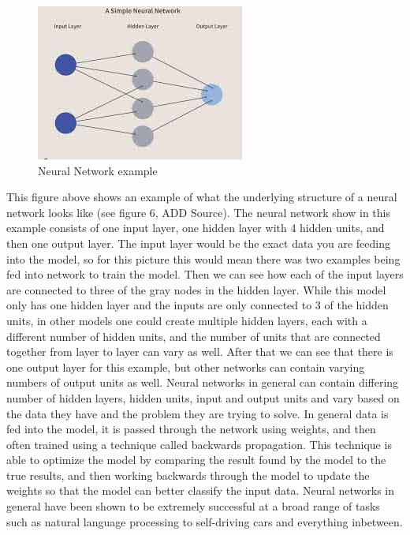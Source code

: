 \documentclass[12pt]{article}
\begin{document}
\begin{figure}

{\centering \includegraphics[width=0.75\linewidth,height=0.25\textheight]{images/neural_net} 

}

\caption{Neural Network example}\label{fig:sample-fig6}
\end{figure}

This figure above shows an example of what the underlying structure of a
neural network looks like (see figure 6, ADD Source). The neural network
show in this example consists of one input layer, one hidden layer with
4 hidden units, and then one output layer. The input layer would be the
exact data you are feeding into the model, so for this picture this
would mean there was two examples being fed into network to train the
model. Then we can see how each of the input layers are connected to
three of the gray nodes in the hidden layer. While this model only has
one hidden layer and the inputs are only connected to 3 of the hidden
units, in other models one could create multiple hidden layers, each
with a different number of hidden units, and the number of units that
are connected together from layer to layer can vary as well. After that
we can see that there is one output layer for this example, but other
networks can contain varying numbers of output units as well. Neural
networks in general can contain differing number of hidden layers,
hidden units, input and output units and vary based on the data they
have and the problem they are trying to solve. In general data is fed
into the model, it is passed through the network using weights, and then
often trained using a technique called backwards propagation. This
technique is able to optimize the model by comparing the result found by
the model to the true results, and then working backwards through the
model to update the weights so that the model can better classify the
input data. Neural networks in general have been shown to be extremely
successful at a broad range of tasks such as natural language processing
to self-driving cars and everything inbetween.
\end{document}
